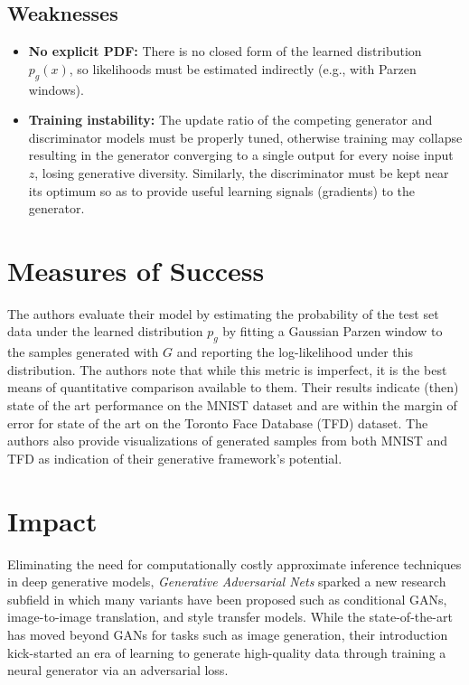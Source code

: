 \documentclass[10pt]{article}
\begin{document}
\subsection*{Weaknesses}
\begin{itemize}
    \item \textbf{No explicit PDF:} There is no closed form of the learned distribution \(p_g(x)\), so likelihoods must be estimated indirectly (e.g., with Parzen windows).
    \item \textbf{Training instability:} The update ratio of the competing generator and discriminator models must be properly tuned, otherwise training may collapse resulting in the generator converging to a single output for every noise input \(z\), losing generative diversity. Similarly, the discriminator must be kept near its optimum so as to provide useful learning signals (gradients) to the generator.
\end{itemize}

\section*{Measures of Success}

The authors evaluate their model by estimating the probability of the test set data under the learned distribution \(p_g\) by fitting a Gaussian Parzen window to the samples generated with \(G\) and reporting the log-likelihood under this distribution. The authors note that while this metric is imperfect, it is the best means of quantitative comparison available to them. Their results indicate (then) state of the art performance on the MNIST dataset and are within the margin of error for state of the art on the Toronto Face Database (TFD) dataset.
The authors also provide visualizations of generated samples from both MNIST and TFD as indication of their generative framework's potential.

\section*{Impact}
Eliminating the need for computationally costly approximate inference techniques in deep generative models, \textit{Generative Adversarial Nets} sparked a new research subfield in which many variants have been proposed such as conditional GANs, image-to-image translation, and style transfer models.
While the state-of-the-art has moved beyond GANs for tasks such as image generation, their introduction kick-started an era of learning to generate high-quality data through training a neural generator via an adversarial loss.



\end{document}
